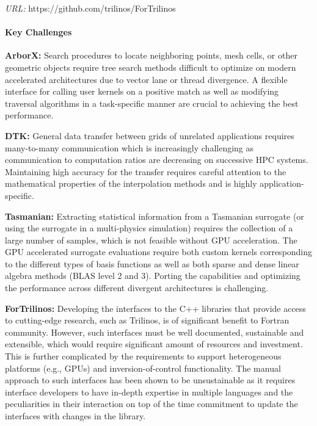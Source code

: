 {\it URL:} https://github.com/trilinos/ForTrilinos

\paragraph{Key Challenges}

\indent

{\bf ArborX:} Search procedures to locate neighboring points, mesh cells, or
other geometric objects require tree search methods difficult to optimize on
modern accelerated architectures due to vector lane or thread divergence. A
flexible interface for calling user kernels on a positive match as well as
modifying traversal algorithms in a task-specific manner are crucial to
achieving the best performance.

{\bf DTK:} General data transfer between grids of unrelated applications
requires many-to-many communication which is increasingly challenging as
communication to computation ratios are decreasing on successive HPC systems.
Maintaining high accuracy for the transfer requires careful attention to the
mathematical properties of the interpolation methods and is highly
application-specific.

{\bf Tasmanian:} Extracting statistical information from a Tasmanian surrogate
(or using the surrogate in a multi-physics simulation) requires the collection
of a large number of samples, which is not feasible without GPU acceleration.
The GPU accelerated surrogate evaluations require both custom kernels
corresponding to the different types of basis functions as well as both
sparse and dense linear algebra methods (BLAS level 2 and 3).
Porting the capabilities and optimizing the performance across different
divergent architectures is challenging.

{\bf ForTrilinos:}
Developing the interfaces to the C++ libraries that provide access to
cutting-edge research, such as Trilinos,  is of significant benefit to Fortran
community. However, such interfaces must be well documented, sustainable and
extensible, which would require significant amount of resources and investment.
This is further complicated by the requirements to support heterogeneous
platforms (e.g., GPUs) and inversion-of-control functionality. The manual
approach to such interfaces has been shown to be unsustainable as it requires
interface developers to have in-depth expertise in  multiple languages and the
peculiarities in their interaction on top of the time commitment to update the
interfaces with changes in the library.

